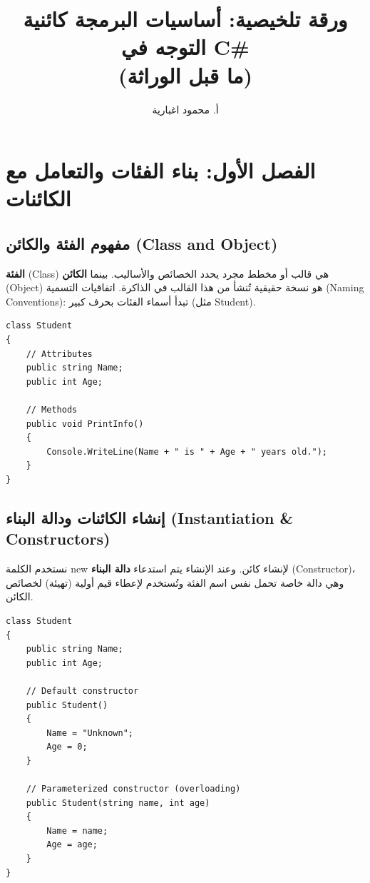 \documentclass[14pt]{extarticle}
\title{ورقة تلخيصية: أساسيات البرمجة كائنية التوجه في \textenglish{C\#} \\ (ما قبل الوراثة)}
\author{أ. محمود اغبارية}
\begin{document}
\maketitle
\thispagestyle{fancy}

\section{الفصل الأول: بناء الفئات والتعامل مع الكائنات}

\subsection{مفهوم الفئة والكائن (\textenglish{Class and Object})}
\textbf{الفئة} (\textenglish{Class}) هي قالب أو مخطط مجرد يحدد الخصائص والأساليب. بينما \textbf{الكائن} (\textenglish{Object}) هو نسخة حقيقية تُنشأ من هذا القالب في الذاكرة.
اتفاقيات التسمية (\textenglish{Naming Conventions}): تبدأ أسماء الفئات بحرف كبير (مثل \textenglish{Student}).

\begin{boxExample}
\begin{english}
\begin{verbatim}
class Student
{
    // Attributes
    public string Name;
    public int Age;

    // Methods
    public void PrintInfo()
    {
        Console.WriteLine(Name + " is " + Age + " years old.");
    }
}
\end{verbatim}
\end{english}
\end{boxExample}

\subsection{إنشاء الكائنات ودالة البناء (\textenglish{Instantiation \& Constructors})}
نستخدم الكلمة \textenglish{new} لإنشاء كائن. وعند الإنشاء يتم استدعاء \textbf{دالة البناء} (\textenglish{Constructor})، وهي دالة خاصة تحمل نفس اسم الفئة وتُستخدم لإعطاء قيم أولية (تهيئة) لخصائص الكائن.

\begin{boxExample}
\begin{english}
\begin{verbatim}
class Student
{
    public string Name;
    public int Age;

    // Default constructor
    public Student()
    {
        Name = "Unknown";
        Age = 0;
    }

    // Parameterized constructor (overloading)
    public Student(string name, int age)
    {
        Name = name;
        Age = age;
    }
}
\end{verbatim}
\end{english}
\end{boxExample}
\end{document}
